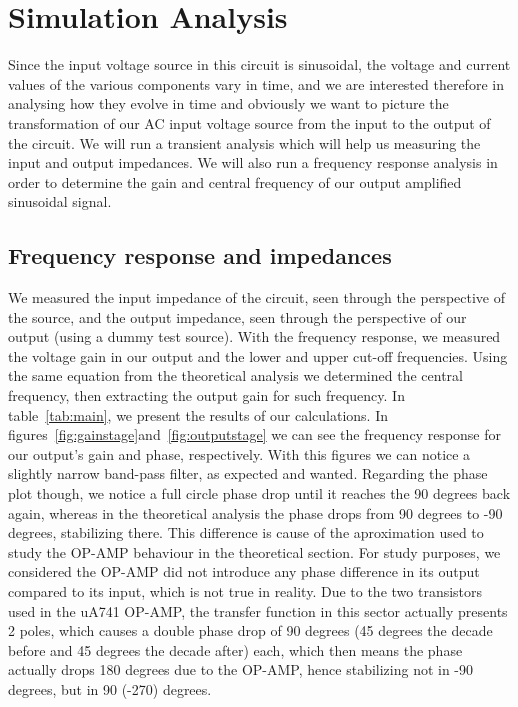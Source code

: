 \newpage
\section{Simulation Analysis}
\label{sec:simulation}
Since the input voltage source in this circuit is sinusoidal, the voltage and current values of the various components vary in time, and we are interested therefore in analysing how they evolve in time and obviously we want to picture the transformation of our AC input voltage source from the input to the output of the circuit. We will run a transient analysis which will help us measuring the input and output impedances. We will also run a frequency response analysis in order to determine the gain and central frequency of our output amplified sinusoidal signal.

\subsection{Frequency response and impedances}
We measured the input impedance of the circuit, seen through the perspective of the source, and the output impedance, seen through the perspective of our output (using a dummy test source). With the frequency response, we measured the voltage gain in our output and the lower and upper cut-off frequencies. Using the same equation from the theoretical analysis we determined the central frequency, then extracting the output gain for such frequency. In table~\ref{tab:main}, we present the results of our calculations. In figures~\ref{fig:gainstage}and~\ref{fig:outputstage} we can see the frequency response for our output's gain and phase, respectively. With this figures we can notice a slightly narrow band-pass filter, as expected and wanted. Regarding the phase plot though, we notice a full circle phase drop until it reaches the 90 degrees back again, whereas in the theoretical analysis the phase drops from 90 degrees to -90 degrees, stabilizing there. This difference is cause of the aproximation used to study the OP-AMP behaviour in the theoretical section. For study purposes, we considered the OP-AMP did not introduce any phase difference in its output compared to its input, which is not true in reality. Due to the two transistors used in the uA741 OP-AMP, the transfer function in this sector actually presents 2 poles, which causes a double phase drop of 90 degrees (45 degrees the decade before and 45 degrees the decade after) each, which then means the phase actually drops 180 degrees due to the OP-AMP, hence stabilizing not in -90 degrees, but in 90 (-270) degrees.

